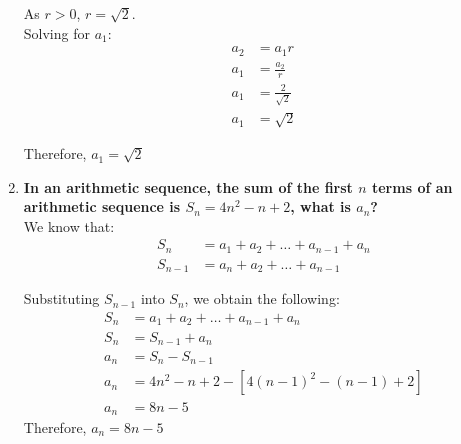 \documentclass[12pt]{article}
\begin{document}
\begin{enumerate}
    As $r>0$, $r = \sqrt{2}$. \\
    
    Solving for $a_1$:
    \begin{align*}
        a_2 & = a_1r \\
        a_1 & = \frac{a_2}{r} \\
        a_1 & = \frac{2}{\sqrt{2}} \\
        a_1 & = \sqrt{2}
    \end{align*}
    
    Therefore, $a_1 = \sqrt{2}$
    
    \item \textbf{In an arithmetic sequence, the sum of the first $n$ terms of an arithmetic sequence is $S_n = 4n^2 - n + 2$, what is $a_n$?} \\
    
    We know that:
    \begin{align*}
        S_n &= a_1 + a_2 + \dots + a_{n - 1} + a_n \\
        S_{n - 1} &= a_n + a_2 + \dots + a_{n - 1}
    \end{align*}
    
    Substituting $S_{n - 1}$ into $S_n$, we obtain the following:
    \begin{align*}
        S_n & = a_1 + a_2 + \dots + a_{n - 1} + a_n \\
        S_n & = S_{n - 1} + a_n \\
        a_n & = S_n - S_{n - 1} \\
        a_n & = 4n^2 - n + 2 - [4(n - 1)^2 - (n - 1) + 2] \\
        a_n & = 8n - 5
    \end{align*}
    Therefore, $a_n = 8n - 5$
\end{enumerate}

\newpage
\end{document}
